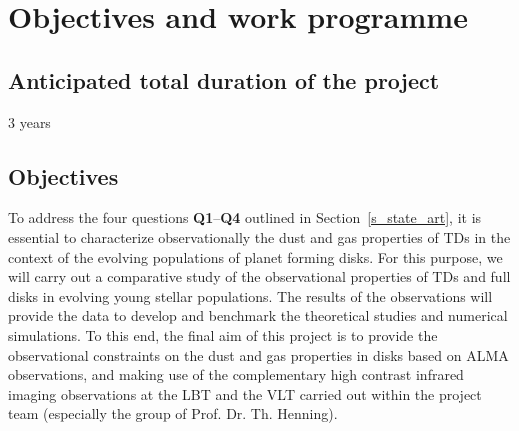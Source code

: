 \documentclass[10pt,fleqn,twoside]{article}
\begin{document}
\section{Objectives and work programme}
\renewcommand{\leftmark}{\sc Objectives and work programme}


\subsection{Anticipated total duration of the project}

3 years

\subsection{Objectives}
\label{s_obj}

To address the four questions {\bf Q1}--{\bf Q4} outlined in Section~\ref{s_state_art}, it is 
essential to characterize observationally the dust and gas properties of TDs in the context
of the evolving populations of planet forming disks. For this purpose, we will carry out a comparative
study of the observational properties of TDs and full disks in evolving young stellar 
populations. The results of the observations will provide the 
data to develop and benchmark the theoretical studies and numerical simulations.  
To this end, the final aim of this project is to provide the observational constraints 
on the dust and gas properties in disks based on ALMA observations, and making use
of the complementary high contrast infrared imaging observations at the LBT and the 
VLT carried out within the project team (especially the group of Prof. Dr. Th. Henning). 
\end{document}
